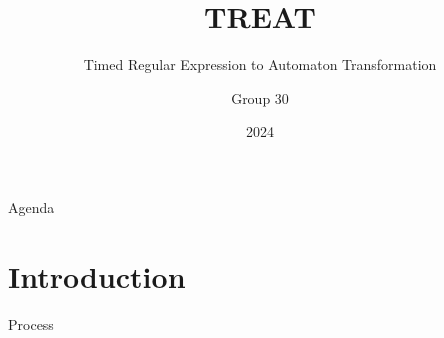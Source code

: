 \documentclass{beamer}
\title{TREAT}
\subtitle{Timed Regular Expression to Automaton Transformation}
\author{Group 30}
\institute{Aalborg Universitet}
\date{2024}
\begin{document}
\frame{\titlepage}

\begin{frame}{Agenda}
    \tableofcontents
\end{frame}

\section{Introduction} %

\begin{frame} {Process}

\end{frame}






\end{document}
